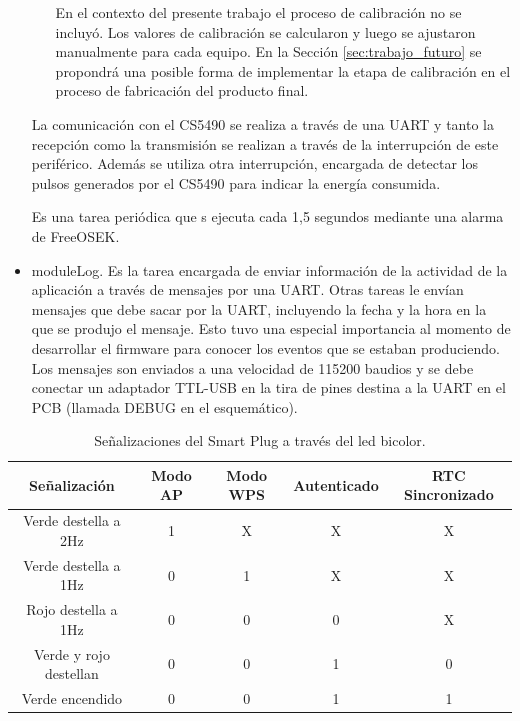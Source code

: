 \begin{itemize}
\begin{itemize}
En el contexto del presente trabajo el proceso de calibración no se incluyó. Los valores de calibración se calcularon y luego se ajustaron manualmente para cada equipo. En la Sección \ref{sec:trabajo_futuro} se propondrá una posible forma de implementar la etapa de calibración en el proceso de fabricación del producto final.
\end{itemize}

La comunicación con el CS5490 se realiza a través de una UART y tanto la recepción como la transmisión se realizan a través de la interrupción de este periférico. Además se utiliza otra interrupción, encargada de detectar los pulsos generados por el CS5490 para indicar la energía consumida.

Es una tarea periódica que s ejecuta cada 1,5 segundos mediante una alarma de FreeOSEK.

\item moduleLog. Es la tarea encargada de enviar información de la actividad de la aplicación a través de mensajes por una UART. Otras tareas le envían mensajes que debe sacar por la UART, incluyendo la fecha y la hora en la que se produjo el mensaje. Esto tuvo una especial importancia al momento de desarrollar el firmware para conocer los eventos que se estaban produciendo. Los mensajes son enviados a una velocidad de 115200 baudios y se debe conectar un adaptador TTL-USB en la tira de pines destina a la UART en el PCB (llamada DEBUG en el esquemático).

\end{itemize}


\begin{table}[h]
	\centering
	\caption[Señalizaciones del Smart Plug]{Señalizaciones del Smart Plug a través del led bicolor.}
	\begin{tabular}{c c c c c}    
		\toprule
		\textbf{Señalización} 	 & \textbf{Modo AP}  & \textbf{Modo WPS}  & \textbf{Autenticado}  & \textbf{RTC Sincronizado} \\
		\midrule
		Verde destella a 2Hz	 	& 1  & X  & X  & X \\		
		Verde destella a 1Hz	 	& 0  & 1  & X  & X \\
		Rojo destella a 1Hz	 		& 0  & 0  & 0  & X \\
		Verde y rojo destellan	 	& 0  & 0  & 1  & 0 \\
		Verde encendido	 			& 0  & 0  & 1  & 1 \\
		\bottomrule
		\hline
	\end{tabular}
	\label{tab:senializacion_leds}
\end{table}


